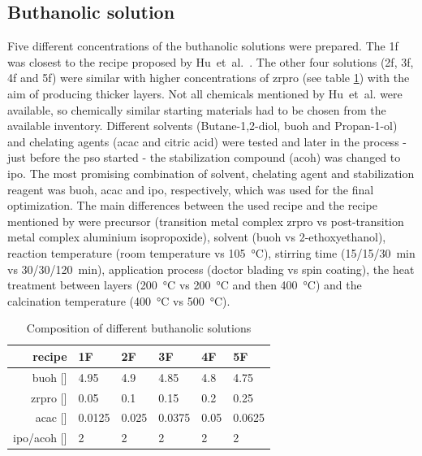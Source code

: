 \subsection{Buthanolic solution}\label{sec:exp-sol-bu}
Five different concentrations of the buthanolic solutions were prepared. 
The \gls{1f} was closest to the recipe proposed by Hu~et~al.~\cite{Hu2016}. 
The other four solutions (\gls{2f}, \gls{3f}, \gls{4f} and \gls{5f}) were similar with 
higher concentrations of \gls{zrpro} (see table \ref{tab:rec2})
with the aim of producing thicker layers.
Not all chemicals mentioned by Hu~et~al.\cite{Hu2016} were available, so chemically similar 
starting materials had to be chosen from the available inventory. 
Different solvents (Butane-1,2-diol, \gls{buoh} and Propan-1-ol) and chelating agents 
(\gls{acac} and citric acid) were tested and later in the process - just before the 
\gls{pso} started - the stabilization compound (\gls{acoh}) was changed to \gls{ipo}.
The most promising combination of solvent, chelating agent and stabilization reagent was 
\gls{buoh}, \gls{acac} and \gls{ipo}, respectively, which was used for the final optimization.
The main differences between the used recipe and the recipe mentioned by \cite{Hu2016} were 
precursor (transition metal complex \gls{zrpro}	\gls{vs} post-transition metal 
complex aluminium isopropoxide), solvent (\gls{buoh} \gls{vs} 2-ethoxyethanol), reaction temperature 
(room temperature \gls{vs} \SI{105}{\celsius}), stirring time (15/15/\SI{30}{\minute}
\gls{vs} 30/30/\SI{120}{\minute}), application process (doctor blading \gls{vs} spin coating), 
the heat treatment between layers (\SI{200}{\celsius} \gls{vs} \SI{200}{\celsius} and then \SI{400}
{\celsius}) and the calcination temperature (\SI{400}{\celsius} \gls{vs}
\SI{500}{\celsius}).

\begin{table}[h]
	\centering
	\caption{Composition of different buthanolic solutions}
	\label{tab:rec2}
	\begin{tabular}{rlllll}
		\hline
		recipe	&1F		&2F		&3F		&4F		&5F		\\
		\hline
		\gls{buoh} [\ml{}]		&4.95	&4.9	&4.85	&4.8	&4.75	\\
		\gls{zrpro} [\ml{}]	&0.05	&0.1	&0.15	&0.2	&0.25	\\
		\gls{acac} [\ml{}]		&0.0125	&0.025	&0.0375	&0.05	&0.0625	\\
		\gls{ipo}/\gls{acoh} [\ml{}]		&2		&2		&2		&2		&2		\\
		\hline
	\end{tabular}
\end{table}

